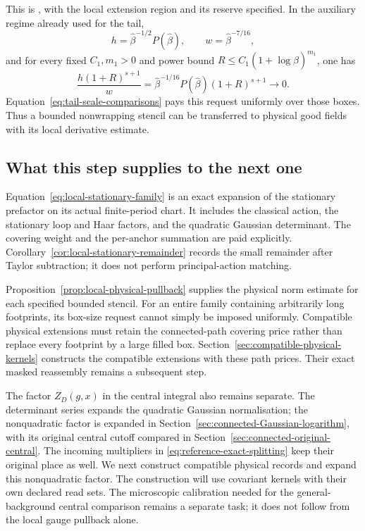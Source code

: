 \documentclass[11pt,reqno]{amsart}
\numberwithin{equation}{section}
\theoremstyle{definition}
\theoremstyle{remark}
\begin{document}
This is \cite[Proposition~16.11 and (16.26)--(16.27),
pp.~88--89]{Main}, with the local extension
region and its reserve specified.
In the auxiliary regime already used for the tail,
\[
       h=\widehat\beta^{-1/2}P(\widehat\beta),
       \qquad w=\widehat\beta^{-7/16},
\]
and for every fixed \(C_1,m_1>0\) and power bound
\(R\le C_1(1+\log\widehat\beta)^{m_1}\), one has
\begin{equation}
       \frac{h(1+R)^{s+1}}w
        =\widehat\beta^{-1/16}
             P(\widehat\beta)(1+R)^{s+1}
                         \longrightarrow0 .
 \label{eq:local-physical-request-compatible}
\end{equation}
Equation~\eqref{eq:tail-scale-comparisons}
pays this request uniformly over those boxes.
Thus a bounded nonwrapping stencil can be
transferred to physical good fields with its
local derivative estimate.

\subsection{What this step supplies to the next one}

Equation~\eqref{eq:local-stationary-family}
is an exact expansion of the stationary
prefactor on its actual finite-period chart.
It includes the classical action, the stationary
loop and Haar factors, and the quadratic Gaussian
determinant.
The covering weight and the per-anchor summation
are paid explicitly.
Corollary~\ref{cor:local-stationary-remainder}
records the small remainder after Taylor
subtraction; it does not perform principal-action
matching.

Proposition~\ref{prop:local-physical-pullback}
supplies the physical norm estimate for each
specified bounded stencil.
For an entire family containing arbitrarily
long footprints, its box-size request cannot
simply be imposed uniformly.
Compatible physical extensions must retain
the connected-path covering price rather than
replace every footprint by a large filled box.
Section~\ref{sec:compatible-physical-kernels}
constructs the compatible extensions with
these path prices. Their exact masked
reassembly remains a subsequent step.

The factor \(Z_D(g,x)\) in the central integral
also remains separate.
The determinant series expands the quadratic
Gaussian normalisation; the nonquadratic
factor is expanded in
Section~\ref{sec:connected-Gaussian-logarithm},
with its original central cutoff compared in
Section~\ref{sec:connected-original-central}.
The incoming multipliers in
\eqref{eq:reference-exact-splitting} keep their
original place as well.
We next construct compatible physical records and
expand this nonquadratic factor. The construction
will use covariant kernels with their own declared
read sets. The microscopic calibration needed for
the general-background central comparison remains
a separate task; it does not follow from the
local gauge pullback alone.
\end{document}
